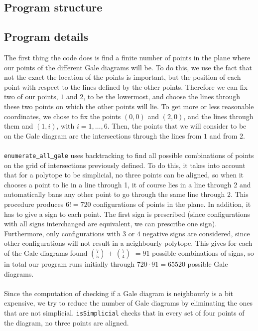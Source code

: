 \documentclass[paper=a4, fontsize=11pt]{scrartcl} %
\theoremstyle{definition}
\begin{document}
\subsection{Program structure}

\subsection{Program details}
The first thing the code does is find a finite number of points in the plane where our points of the different Gale diagrams will be. To do this, we use the fact that not the exact the location of the points is important, but the position of each point with respect to the lines defined by the other points. Therefore we can fix two of our points, $1$ and $2$, to be the lowermost, and choose the lines through these two points on which the other points will lie. To get more or less reasonable coordinates, we chose to fix the points $(0,0)$ and $(2,0)$, and the lines through them and $(1,i)$, with $i =1,\ldots,6$. Then, the points that we will consider to be on the Gale diagram are the intersections through the lines from $1$ and from $2$.\\
\\
\texttt{enumerate\underline{ }all\underline{ }gale} uses backtracking to find all possible combinations of  points on the grid of intersections previously defined. To do this, it takes into account that for a polytope to be simplicial, no three points can be aligned, so when it chooses a point to lie in a line through 1, it of course lies in a line through 2 and automatically bans any other point to go through the same line through 2. This procedure produces $6! = 720$ configurations of points in the plane. In addition, it has to give a sign to each point. The first sign is prescribed (since configurations with all signs interchanged are equivalent, we can prescribe one sign). Furthermore, only configurations with $3$ or $4$ negative signs are considered, since other configurations will not result in a neighbourly polytope. This gives for each of the Gale diagrams found $7\choose 5$ $+$ $7\choose 4$ $= 91$ possible combinations of signs, so in total our program runs initially through $720\cdot 91 = 65520$ possible Gale diagrams.\\
\\
Since the computation of checking if a Gale diagram is neighbourly is a bit expensive, we try to reduce the number of Gale diagrams by eliminating the ones that are not simplicial. \texttt{isSimplicial} checks that in every set of four points of the diagram, no three points are aligned.\\
\end{document}
